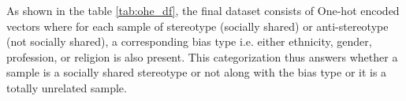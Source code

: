 As shown in the table \ref{tab:ohe_df}, the final dataset consists of One-hot encoded vectors where for each sample of stereotype (socially shared) or anti-stereotype (not socially shared), a corresponding bias type i.e. either ethnicity, gender, profession, or religion is also present. This categorization thus answers whether a sample is a socially shared stereotype or not along with the bias type or it is a totally unrelated sample.

